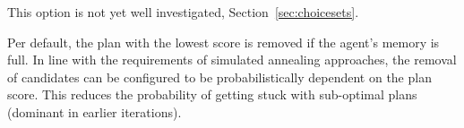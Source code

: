 This option is not yet well investigated, \cf Section~\ref{sec:choicesets}.

Per default, the plan with the lowest score is removed if the agent's memory is full. 
In line with the requirements of \eg simulated annealing approaches, the removal of candidates can be configured to be probabilistically dependent on the plan score. This reduces the probability of getting stuck with sub-optimal plans (dominant in earlier iterations).


